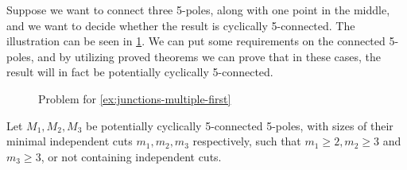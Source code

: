 \documentclass[12pt, twoside]{book}
\begin{document}
\begin{example}\label{ex:junctions-multiple-first}
	Suppose we want to connect three 5-poles, along with one point in the middle, and we want to decide whether the result is cyclically 5-connected. The illustration can be seen in \cref{fig:3-5-poles-connected}. We can put some requirements on the connected 5-poles, and by utilizing proved theorems we can prove that in these cases, the result will in fact be potentially cyclically 5-connected.
	
	\begin{figure}
		\centering
		\caption{Problem for \cref{ex:junctions-multiple-first}}
		\label{fig:3-5-poles-connected}
	\end{figure}
	
	Let $M_1,M_2,M_3$ be potentially cyclically 5-connected 5-poles, with sizes of their minimal independent cuts $m_1,m_2,m_3$ respectively, such that $m_1\geq 2,m_2\geq 3$ and $m_3\geq 3$, or not containing independent cuts.
	
	\begin{figure}
		\centering
\end{figure}
\end{example}
\end{document}
